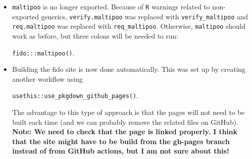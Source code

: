\documentclass{article}
\begin{document}
\begin{itemize}
    \begin{lstlisting}[language=R]
    cat <<EOF > test-omp.cpp
    #include <omp.h>
    int main() {
        return omp_get_num_threads();
    }
    EOF

    ## Execute R CMD SHLIB.
    if ${CC} ${CFLAGS} -fopenmp test-omp.cpp >/dev/null 2>&1; then
        { printf "%s\n" "$as_me:${as_lineno-$LINENO}: result: yes"
        >&5 printf "%s\n" "yes" >&6; }
        openmp_already_works="yes"
    else
        { printf "%s\n" "$as_me:${as_lineno-$LINENO}: result: no" 
        >&5 printf "%s\n" "no" >&6; }
    fi
    \end{lstlisting}
    with 
    \begin{lstlisting}[language=R]
        cat > test-omp.cpp <<EOF
        #include <omp.h>
        extern "C" void configtest(int * arg) {
          *arg = omp_get_num_threads();
        }
        EOF
        # Without the following you're relying on the GNU/Linux-like behaviour
        # w.r.t. undefined symbols (see WRE 1.2.1.1):
        cat > Makevars <<EOF
        PKG_CXXFLAGS = \$(SHLIB_OPENMP_CXXFLAGS)
        PKG_LIBS = \$(SHLIB_OPENMP_CXXFLAGS)
        EOF
        R CMD SHLIB test-omp.cpp
    \end{lstlisting}

    This solution was given by Ivan Krylov on the \texttt{r-package-devel} mailing list. The specific email can be seen here (\url{https://stat.ethz.ch/pipermail/r-package-devel/2024q2/010822.html}). \textbf{Note:} I checked this with my system, and OpenMP support still worked.
    \item \texttt{maltipoo} is no longer exported. Because of \texttt{R} warnings related to non-exported generics, \texttt{verify.maltipoo} was replaced with \texttt{verify\_maltipoo} and \texttt{req.maltipoo} was replaced with \texttt{req\_maltipoo}. Otherwise, \texttt{maltipoo} should work as before, but three colons will be needed to run:

    \texttt{fido:::maltipoo()}.
    \item Building the fido site is now done automatically. This was set up by creating another workflow using

    \texttt{usethis::use\_pkgdown\_github\_pages()}.

    The advantage to this type of approach is that the pages will not need to be built each time (and we can probably remove the related files on GitHub). \textbf{Note: We need to check that the page is linked properly. I think that the site might have to be build from the gh-pages branch instead of from GitHub actions, but I am not sure about this!}
\end{itemize}
\end{document}
